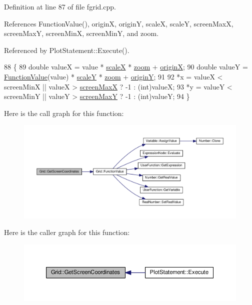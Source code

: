 Definition at line 87 of file fgrid.\+cpp.



References Function\+Value(), originX, originY, scaleX, scaleY, screen\+MaxX, screen\+MaxY, screen\+MinX, screen\+MinY, and zoom.



Referenced by Plot\+Statement\+::\+Execute().


\begin{DoxyCode}
88 \{
89     \textcolor{keywordtype}{double} valueX = value * \hyperlink{classGrid_a33d8811a6746553710cd815a535a9f13}{scaleX} * \hyperlink{classGrid_a9a224c7ba4c55ff3672ae1b950796768}{zoom} + \hyperlink{classGrid_a0c0e10fa32d7fa78985cba0df1a34a0f}{originX};
90     \textcolor{keywordtype}{double} valueY = \hyperlink{classGrid_a9e403482f403a28e3a152b435526829b}{FunctionValue}(value) * \hyperlink{classGrid_ab973a5a172794c1e8d87f2cad3f7cea9}{scaleY} * \hyperlink{classGrid_a9a224c7ba4c55ff3672ae1b950796768}{zoom} + 
      \hyperlink{classGrid_add0854295a7e36ab9f77889862bfda0e}{originY};
91 
92     *x = valueX < screenMinX || valueX > \hyperlink{classGrid_ad662ef34930a80011080a45a975cae79}{screenMaxX} ? -1 : (int)valueX;
93     *y = valueY < screenMinY || valueY > \hyperlink{classGrid_a9ff802b20cf95e066646d24aa284a547}{screenMaxY} ? -1 : (int)valueY;
94 \}
\end{DoxyCode}


Here is the call graph for this function\+:\nopagebreak
\begin{figure}[H]
\begin{center}
\leavevmode
\includegraphics[width=350pt]{classGrid_a430009c581ae9350ec310f63c1b89140_cgraph}
\end{center}
\end{figure}




Here is the caller graph for this function\+:\nopagebreak
\begin{figure}[H]
\begin{center}
\leavevmode
\includegraphics[width=350pt]{classGrid_a430009c581ae9350ec310f63c1b89140_icgraph}
\end{center}
\end{figure}


